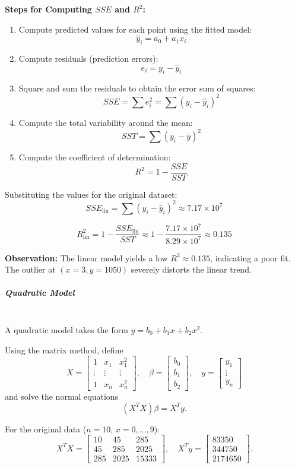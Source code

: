 \textbf{Steps for Computing $SSE$ and $R^2$:}
\begin{enumerate}
    \item Compute predicted values for each point using the fitted model:
    \[
    \hat{y}_i = a_0 + a_1x_i
    \]
    \item Compute residuals (prediction errors):
    \[
    e_i = y_i - \hat{y}_i
    \]
    \item Square and sum the residuals to obtain the error sum of squares:
    \[
    SSE = \sum e_i^2 = \sum (y_i - \hat{y}_i)^2
    \]
    \item Compute the total variability around the mean:
    \[
    SST = \sum (y_i - \bar{y})^2
    \]
    \item Compute the coefficient of determination:
    \[
    R^2 = 1 - \frac{SSE}{SST}
    \]
\end{enumerate}

Substituting the values for the original dataset:
\[
SSE_{\text{lin}} = \sum (y_i - \hat{y}_i)^2 \approx 7.17 \times 10^7
\]

\[
R^2_{\text{lin}} = 1 - \frac{SSE_{\text{lin}}}{SST} \approx 1 - \frac{7.17 \times 10^7}{8.29 \times 10^7} \approx 0.135
\]

\textbf{Observation:} The linear model yields a low $R^2 \approx 0.135$, indicating a poor fit. The outlier at $(x=3, y=1050)$ severely distorts the linear trend.

\subparagraph{Quadratic Model} \mbox{} \\
A quadratic model takes the form $y = b_0 + b_1 x + b_2 x^2$. 

Using the matrix method, define
\[
X = \begin{bmatrix}
1 & x_1 & x_1^2 \\
\vdots & \vdots & \vdots \\
1 & x_n & x_n^2
\end{bmatrix},
\quad
\beta = \begin{bmatrix} b_0 \\ b_1 \\ b_2 \end{bmatrix},
\quad
y = \begin{bmatrix} y_1 \\ \vdots \\ y_n \end{bmatrix}
\]
and solve the normal equations
\[
(X^T X)\beta = X^T y.
\]

For the original data ($n=10$, $x=0,\dots,9$):
\[
X^T X =
\begin{bmatrix}
10 & 45 & 285 \\
45 & 285 & 2025 \\
285 & 2025 & 15333
\end{bmatrix},
\quad
X^T y =
\begin{bmatrix}
83350 \\
344750 \\
2174650
\end{bmatrix}.
\]

